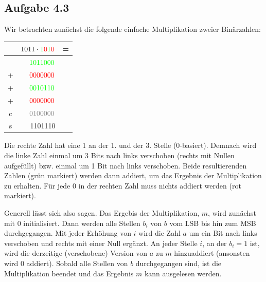 \documentclass{article}
\begin{document}
    \subsection*{Aufgabe 4.3}
    Wir betrachten zunächst die folgende einfache Multiplikation zweier Binärzahlen:
    \begin{table}[h]
        \centering
        \begin{tabular}{crl}
            & $1011 \cdot \textcolor{green}{1}\textcolor{red}{0}\textcolor{green}{1}\textcolor{red}{0}$ & = \\ \hline
            & $\textcolor{green}{1011000}$ \\
           +& $\textcolor{red}{0000000}$ \\
           +& $\textcolor{green}{0010110}$ \\
           +& $\textcolor{red}{0000000}$ \\ 
           c& $\textcolor{gray}{0100000}$ \\ \hline
           s& 1101110
       \end{tabular} 
    \end{table}

    Die rechte Zahl hat eine 1 an der 1. und der 3. Stelle (0-basiert). Demnach wird die linke Zahl einmal um 3 Bits nach links verschoben (rechts mit Nullen aufgefüllt) bzw. einmal um 1 Bit nach links verschoben. Beide resultierenden Zahlen (grün markiert) werden dann addiert, um das Ergebnis der Multiplikation zu erhalten. Für jede 0 in der rechten Zahl muss nichts addiert werden (rot markiert).

    Generell lässt sich also sagen. Das Ergebis der Multiplikation, $m$, wird zunächst mit 0 initialisiert. Dann werden alle Stellen $b_i$ von $b$ vom LSB bis hin zum MSB durchgegangen. Mit jeder Erhöhung von $i$ wird die Zahl $a$ um ein Bit nach links verschoben und rechts mit einer Null ergänzt. An jeder Stelle $i$, an der $b_i = 1$ ist, wird die derzeitige (verschobene) Version von $a$ zu $m$ hinzuaddiert (ansonsten wird 0 addiert). Sobald alle Stellen von $b$ durchgegangen sind, ist die Multiplikation beendet und das Ergebnis $m$ kann ausgelesen werden. 
\end{document}
